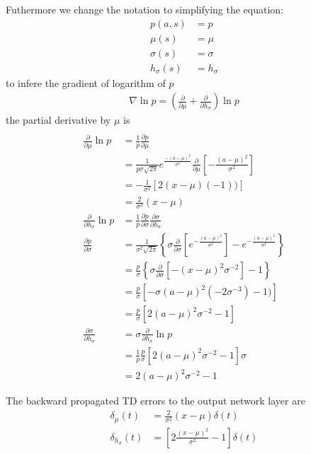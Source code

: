 \documentclass[]{article}
\begin{document}
Futhermore we change the notation to simplifying the equation:
\begin{align*}
	p(a, s)& = p
	\\
	\mu(s)& = \mu
	\\
	\sigma(s)& = \sigma
	\\
	h_\sigma(s)& = h_\sigma
\end{align*}
to infere the gradient of logarithm of $ p $
\begin{align*}
\nabla \ln p = \left(
	\frac{\partial}{\partial \mu} + \frac{\partial}{\partial h_\sigma}
	\right)
	\ln p
\end{align*}
the partial derivative by $\mu$ is 
\begin{align*}
\\
	\frac{\partial}{\partial \mu} \ln p& = \frac{1}{p} \frac{\partial p}{\partial \mu}
	\\
	& = \frac{1}{p \sigma \sqrt{2 \pi} } e^{\frac{-(a-\mu)^2}{\sigma^2}} \frac{\partial}{\partial \mu} \left[ -\frac{(a-\mu)^2}{\sigma^2} \right]
	\\
	& = - \frac{1}{\sigma^2}[2 (x-\mu) (-1))]
	\\
	& = \frac{2}{\sigma^2}(x-\mu)
	\\
	\frac{\partial}{\partial h_\sigma} \ln p& = \frac{1}{p} \frac{\partial p}{\partial \sigma} \frac{\partial \sigma}{\partial h_\sigma}
	\\
	\frac{\partial p}{\partial \sigma}& = \frac{1}{\sigma^2 \sqrt{2 \pi}}
	\left\{
		\sigma \frac{\partial}{\partial \sigma}
		\left[
			e^{-\frac{(a-\mu)^2}{\sigma^2}}
		\right]
		- e^{-\frac{(a-\mu)^2}{\sigma^2}}
	\right\}
	\\
	& = \frac{p}{\sigma}
	\left\{
		\sigma \frac{\partial}{\partial \sigma}
		\left[
			-(x - \mu)^2\sigma^{-2}
		\right] - 1
	\right\}
	\\
	& = \frac{p}{\sigma}
	\left[
		-\sigma (a - \mu)^2 (-2 \sigma^{-3}) - 1)
	\right]
	\\
	& = \frac{p}{\sigma}
	\left[
		2(a-\mu)^2 \sigma^{-2} - 1
	\right]
	\\
	\frac{\partial \sigma}{\partial h_\sigma}& = \sigma
	\frac{\partial}{\partial h_\sigma} \ln p
	\\
	& = \frac{1}{p}
	\frac{p}{\sigma}
	\left[
		2(a-\mu)^2 \sigma^{-2} - 1
	\right] \sigma
	\\
	& = 2(a-\mu)^2 \sigma^{-2} - 1
\end{align*}

The backward propagated TD errors to the output network layer are
\begin{align}
	\delta_\mu(t)&		= \frac{2}{\sigma^2}(x-\mu) \delta (t)
	\\
	\delta_{h_\sigma}(t)&	= \left[
		2\frac{(x-\mu)^2}{\sigma^2} - 1
	\right] \delta(t)
\end{align}
\end{document}
